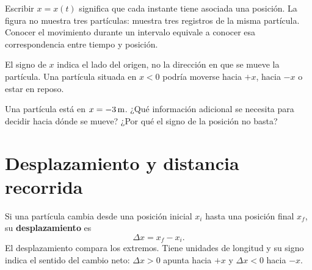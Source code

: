 \documentclass[11pt]{article}
\begin{document}
\begin{center}
\end{center}

Escribir \(x=x(t)\) significa que cada instante tiene asociada una posición.
La figura no muestra tres partículas: muestra tres registros de la misma
partícula. Conocer el movimiento durante un intervalo equivale a conocer esa
correspondencia entre tiempo y posición.

El signo de \(x\) indica el lado del origen, no la dirección en que se mueve la
partícula. Una partícula situada en \(x<0\) podría moverse hacia \(+x\), hacia
\(-x\) o estar en reposo.

\begin{pregunta}
Una partícula está en \(x=-3\,\mathrm{m}\). ¿Qué información adicional se
necesita para decidir hacia dónde se mueve? ¿Por qué el signo de la posición no
basta?
\end{pregunta}

\section{Desplazamiento y distancia recorrida}

Si una partícula cambia desde una posición inicial \(x_i\) hasta una posición
final \(x_f\), su \textbf{desplazamiento} es
\[
  \Delta x=x_f-x_i.
\]
El desplazamiento compara los extremos. Tiene unidades de longitud y su signo
indica el sentido del cambio neto: \(\Delta x>0\) apunta hacia \(+x\) y
\(\Delta x<0\) hacia \(-x\).
\end{document}
